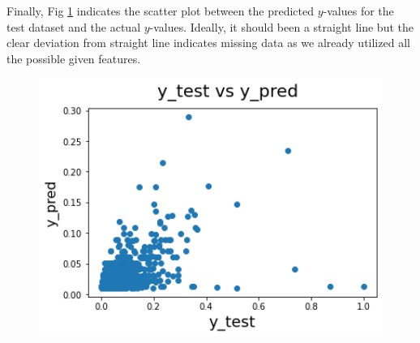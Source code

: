 \documentclass[12pt]{article}
\theoremstyle{plain}
\numberwithin{equation}{section}
\begin{document}
Finally, Fig \ref{fig:test_pred} indicates the scatter plot between the predicted $y$-values for the test dataset and the actual $y$-values. Ideally, it should been a straight line but the clear deviation from straight line indicates missing data as we already utilized all the possible given features. 

\begin{figure}
\centering
\includegraphics[width=12cm]{Images/test_pred.png}
\caption{}
\label{fig:test_pred}
\end{figure}




\end{document}
